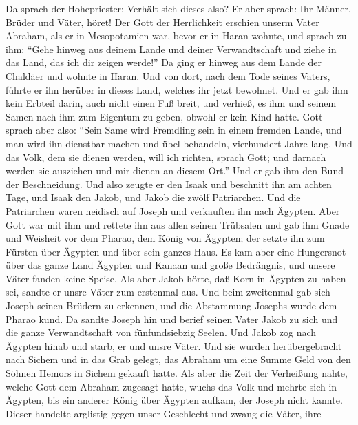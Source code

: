  Da sprach der Hohepriester: Verhält sich dieses also?
 Er aber sprach: Ihr Männer, Brüder und Väter, höret! Der
Gott der Herrlichkeit erschien unserm Vater Abraham, als er in
Mesopotamien war, bevor er in Haran wohnte, und sprach zu ihm:
 ``Gehe hinweg aus deinem Lande und deiner Verwandtschaft
und ziehe in das Land, das ich dir zeigen werde!''  Da
ging er hinweg aus dem Lande der Chaldäer und wohnte in Haran. Und von
dort, nach dem Tode seines Vaters, führte er ihn herüber in dieses Land,
welches ihr jetzt bewohnet.  Und er gab ihm kein Erbteil
darin, auch nicht einen Fuß breit, und verhieß, es ihm und seinem Samen
nach ihm zum Eigentum zu geben, obwohl er kein Kind hatte.
 Gott sprach aber also: ``Sein Same wird Fremdling sein in
einem fremden Lande, und man wird ihn dienstbar machen und übel
behandeln, vierhundert Jahre lang.  Und das Volk, dem sie
dienen werden, will ich richten, sprach Gott; und darnach werden sie
ausziehen und mir dienen an diesem Ort.''  Und er gab ihm
den Bund der Beschneidung. Und also zeugte er den Isaak und beschnitt
ihn am achten Tage, und Isaak den Jakob, und Jakob die zwölf
Patriarchen.  Und die Patriarchen waren neidisch auf
Joseph und verkauften ihn nach Ägypten.  Aber Gott war
mit ihm und rettete ihn aus allen seinen Trübsalen und gab ihm Gnade und
Weisheit vor dem Pharao, dem König von Ägypten; der setzte ihn zum
Fürsten über Ägypten und über sein ganzes Haus.  Es kam
aber eine Hungersnot über das ganze Land Ägypten und Kanaan und große
Bedrängnis, und unsere Väter fanden keine Speise.  Als
aber Jakob hörte, daß Korn in Ägypten zu haben sei, sandte er unsre
Väter zum erstenmal aus.  Und beim zweitenmal gab sich
Joseph seinen Brüdern zu erkennen, und die Abstammung Josephs wurde dem
Pharao kund.  Da sandte Joseph hin und berief seinen
Vater Jakob zu sich und die ganze Verwandtschaft von fünfundsiebzig
Seelen.  Und Jakob zog nach Ägypten hinab und starb, er
und unsre Väter.  Und sie wurden herübergebracht nach
Sichem und in das Grab gelegt, das Abraham um eine Summe Geld von den
Söhnen Hemors in Sichem gekauft hatte.  Als aber die Zeit
der Verheißung nahte, welche Gott dem Abraham zugesagt hatte, wuchs das
Volk und mehrte sich in Ägypten,  bis ein anderer König
über Ägypten aufkam, der Joseph nicht kannte.  Dieser
handelte arglistig gegen unser Geschlecht und zwang die Väter, ihre
